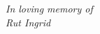 \newpage
\thispagestyle{empty}

\vspace*{14em}
    
{%
    \centering
    \textit{In loving memory of}\\
    \textit{Rut Ingrid}
    \par
}